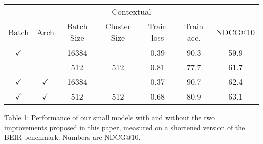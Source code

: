 \begin{tabular}{ccccccc}
\hline \multicolumn{7}{c}{ Contextual } \\
Batch & Arch & Batch Size & Cluster Size & Train loss & Train acc. & NDCG@10 \\
\hline\(\checkmark\) & & 16384 & - & 0.39 & 90.3 & 59.9 \\
& & 512 & 512 & 0.81 & 77.7 & 61.7 \\
\(\checkmark\) & \(\checkmark\) & 16384 & - & 0.37 & 90.7 & 62.4 \\
\(\checkmark\) & \(\checkmark\) & 512 & 512 & 0.68 & 80.9 & 63.1 \\
\hline
\end{tabular}
Table 1: Performance of our small models with and without the two improvements proposed in this paper, measured on a shortened version of the BEIR benchmark. Numbers are NDCG@10.
